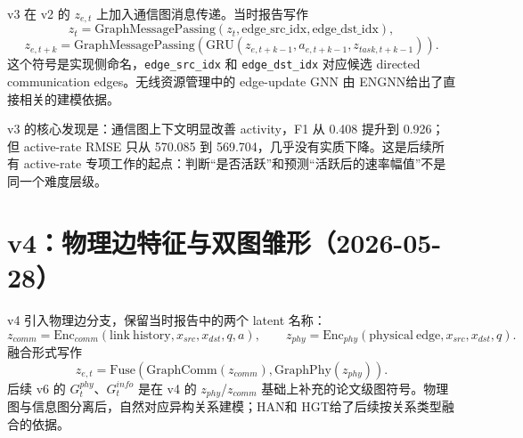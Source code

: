 \documentclass[UTF8,a4paper,11pt]{ctexart}
\newcommand{\code}[1]{\texttt{#1}}
\begin{document}
v3 在 v2 的 $z_{e,t}$ 上加入通信图消息传递。当时报告写作
\[
z_t=\mathrm{GraphMessagePassing}(z_t,\mathrm{edge\_src\_idx},\mathrm{edge\_dst\_idx}),
\]
\[
z_{e,t+k}=\mathrm{GraphMessagePassing}(\mathrm{GRU}(z_{e,t+k-1},a_{e,t+k-1},z_{task,t+k-1})).
\]
这个符号是实现侧命名，\code{edge\_src\_idx} 和 \code{edge\_dst\_idx} 对应候选 directed communication edges。无线资源管理中的 edge-update GNN 由 ENGNN给出了直接相关的建模依据。

\begin{table}[H]
\centering
\small
{}
\caption{v3 communication graph rollout 与 v2 的 test seed 4 对比，来源为 \code{world\_model\_v3\_graph\_rollout\_report.md}。}
\end{table}

v3 的核心发现是：通信图上下文明显改善 activity，F1 从 0.408 提升到 0.926；但 active-rate RMSE 只从 570.085 到 569.704，几乎没有实质下降。这是后续所有 active-rate 专项工作的起点：判断“是否活跃”和预测“活跃后的速率幅值”不是同一个难度层级。

\section{v4：物理边特征与双图雏形（2026-05-28）}

v4 引入物理边分支，保留当时报告中的两个 latent 名称：
\[
z_{comm}=\mathrm{Enc}_{comm}(\mathrm{link\ history},x_{src},x_{dst},q,a),
\qquad
z_{phy}=\mathrm{Enc}_{phy}(\mathrm{physical\ edge},x_{src},x_{dst},q).
\]
融合形式写作
\[
z_{e,t}=\mathrm{Fuse}(\mathrm{GraphComm}(z_{comm}),\mathrm{GraphPhy}(z_{phy})).
\]
后续 v6 的 $G_t^{phy}$、$G_t^{info}$ 是在 v4 的 $z_{phy}$/$z_{comm}$ 基础上补充的论文级图符号。物理图与信息图分离后，自然对应异构关系建模；HAN和 HGT给了后续按关系类型融合的依据。

\begin{table}[H]
\centering
\small
{}
\caption{v4 dual-graph rollout 与 v3 的 test seed 4 主结果，来源为 \code{world\_model\_v4\_dual\_graph\_rollout\_report.md}。}
\end{table}
\end{document}
